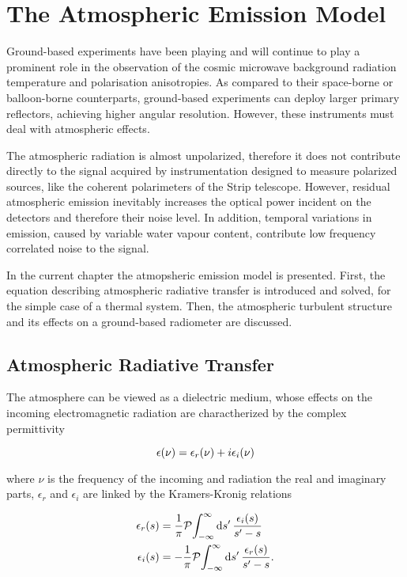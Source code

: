 \chapter{The Atmospheric Emission Model}\label{ch:atm_model}

Ground-based experiments have been playing and will continue to play a
prominent role in the observation of the cosmic microwave background
radiation temperature and polarisation anisotropies. As compared to
their space-borne or balloon-borne counterparts, ground-based experiments
can deploy larger primary reflectors, achieving higher angular resolution.
However, these instruments must deal with atmospheric effects.

The atmospheric radiation is almost unpolarized, therefore it does not
contribute directly to the signal acquired by instrumentation designed to
measure polarized sources, like the coherent polarimeters of the Strip
telescope. However, residual atmospheric emission inevitably increases the
optical power incident on the detectors and therefore their noise level. In
addition, temporal variations in emission, caused by variable water vapour
content, contribute low frequency correlated noise to the signal.

In the current chapter the atmopsheric emission model is presented. First,
the equation describing atmospheric radiative transfer is introduced and
solved, for the simple case of a thermal system. Then, the atmospheric
turbulent structure and its effects on a ground-based radiometer are
discussed.

\section{Atmospheric Radiative Transfer}

The atmosphere can be viewed as a dielectric medium, whose effects on the
incoming electromagnetic radiation are charactherized by the complex permittivity

\begin{equation}
        \epsilon\qty(\nu) = \epsilon_r\qty(\nu) + i\epsilon_i\qty(\nu)
\end{equation}

where $\nu$ is the frequency of the incoming and radiation the real and
imaginary parts, $\epsilon_r$ and $\epsilon_i$ are linked by the
Kramers-Kronig relations

\begin{align}
        \epsilon_r\qty(s) & = \frac{1}{\pi}
        \principalvalue{\int^\infty_{-\infty}\dd{s'}
        \frac{\epsilon_i\qty(s)}{s' - s}} \label{eq:kk_relations_1} \\
        \epsilon_i\qty(s) & = -\frac{1}{\pi}
        \principalvalue{\int^\infty_{-\infty}\dd{s'}
        \frac{\epsilon_r\qty(s)}{s' - s}} \label{eq:kk_relations_2}.
\end{align}

